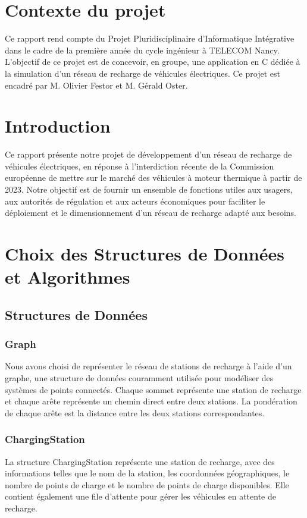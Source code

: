 \documentclass[french,a4paper]{article}
\begin{document}
\section{Contexte du projet}
Ce rapport rend compte du Projet Pluridisciplinaire d’Informatique Intégrative dans le cadre de la première année du cycle ingénieur à TELECOM Nancy.
L’objectif de ce projet est de concevoir, en groupe,  une application en C dédiée à la simulation d’un réseau de recharge de véhicules électriques. Ce projet est encadré par M. Olivier Festor et M. Gérald Oster.
\section{Introduction}
Ce rapport présente notre projet de développement d'un réseau de recharge de véhicules électriques, en réponse à l'interdiction récente de la Commission européenne de mettre sur le marché des véhicules à moteur thermique à partir de 2023. Notre objectif est de fournir un ensemble de fonctions utiles aux usagers, aux autorités de régulation et aux acteurs économiques pour faciliter le déploiement et le dimensionnement d'un réseau de recharge adapté aux besoins.
\section{Choix des Structures de Données et Algorithmes}
\subsection{Structures de Données}
\subsubsection{Graph}
Nous avons choisi de représenter le réseau de stations de recharge à l'aide d'un graphe, une structure de données couramment utilisée pour modéliser des systèmes de points connectés. Chaque sommet représente une station de recharge et chaque arête représente un chemin direct entre deux stations. La pondération de chaque arête est la distance entre les deux stations correspondantes.

\subsubsection{ChargingStation}

La structure ChargingStation représente une station de recharge, avec des informations telles que le nom de la station, les coordonnées géographiques, le nombre de points de charge et le nombre de points de charge disponibles. Elle contient également une file d'attente pour gérer les véhicules en attente de recharge.
\end{document}
